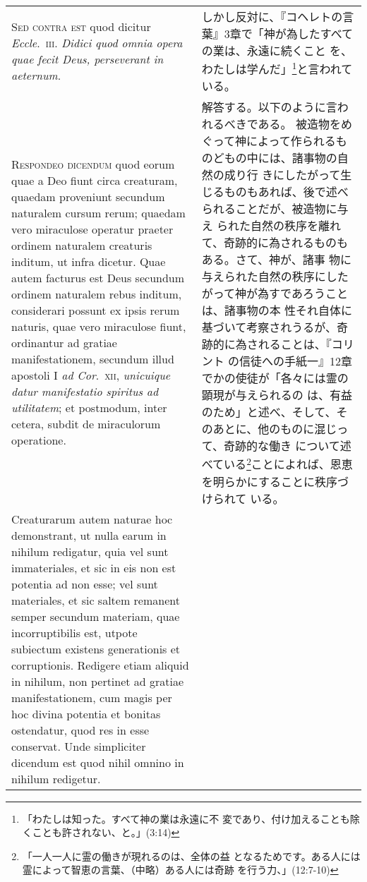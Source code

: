 \documentclass[10pt]{jsarticle} %
\begin{document}
\begin{longtable}{p{21em}p{21em}}
\\


{\scshape  Sed contra est} quod dicitur
{\itshape Eccle}.~{\scshape iii}. {\itshape Didici quod omnia opera quae fecit Deus, perseverant in
aeternum}.

&

しかし反対に、『コヘレトの言葉』3章で「神が為したすべての業は、永遠に続くこと
 を、わたしは学んだ」\footnote{「わたしは知った。すべて神の業は永遠に不
 変であり、付け加えることも除くことも許されない、と。」(3:14)}と言われている。

\\


{\scshape Respondeo dicendum} quod eorum quae a Deo
fiunt circa creaturam, quaedam proveniunt secundum naturalem cursum
rerum; quaedam vero miraculose operatur praeter ordinem naturalem
creaturis inditum, ut infra dicetur. Quae autem facturus est Deus
secundum ordinem naturalem rebus inditum, considerari possunt ex ipsis
rerum naturis, quae vero miraculose fiunt, ordinantur ad gratiae
manifestationem, secundum illud apostoli I {\itshape ad Cor}.~{\scshape xii}, {\itshape unicuique datur
manifestatio spiritus ad utilitatem}; et postmodum, inter cetera, subdit
de miraculorum operatione. 


&

解答する。以下のように言われるべきである。
被造物をめぐって神によって作られるものどもの中には、諸事物の自然の成り行
 きにしたがって生じるものもあれば、後で述べられることだが、被造物に与え
 られた自然の秩序を離れて、奇跡的に為されるものもある。さて、神が、諸事
 物に与えられた自然の秩序にしたがって神が為すであろうことは、諸事物の本
 性それ自体に基づいて考察されうるが、奇跡的に為されることは、『コリント
 の信徒への手紙一』12章でかの使徒が「各々には霊の顕現が与えられるの
 は、有益のため」と述べ、そして、そのあとに、他のものに混じって、奇跡的な働き
 について述べている\footnote{「一人一人に霊の働きが現れるのは、全体の益
 となるためです。ある人には霊によって智恵の言葉、（中略）ある人には奇跡
 を行う力、」(12:7-10)}ことによれば、恩恵を明らかにすることに秩序づけられて
 いる。

\\



Creaturarum autem naturae hoc demonstrant, ut
nulla earum in nihilum redigatur, quia vel sunt immateriales, et sic in
eis non est potentia ad non esse; vel sunt materiales, et sic saltem
remanent semper secundum materiam, quae incorruptibilis est, utpote
subiectum existens generationis et corruptionis. Redigere etiam aliquid
in nihilum, non pertinet ad gratiae manifestationem, cum magis per hoc
divina potentia et bonitas ostendatur, quod res in esse conservat. Unde
simpliciter dicendum est quod nihil omnino in nihilum redigetur.


\end{longtable}
\end{document}

